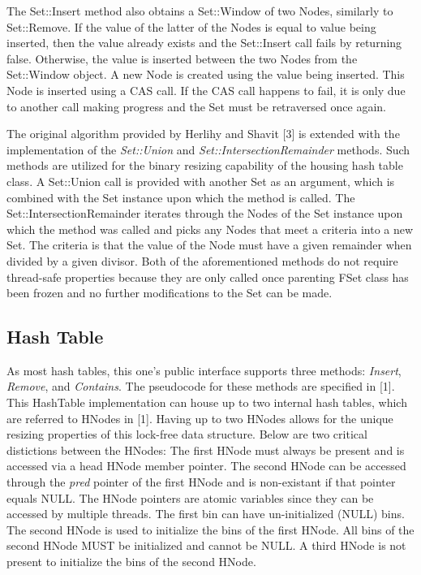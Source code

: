 \documentclass[11pt]{article} %
\begin{document}
The Set::Insert method also obtains a Set::Window of two Nodes, similarly to Set::Remove. If the value of the latter of the Nodes is equal to value being inserted, then the value already exists and the Set::Insert call fails by returning false. Otherwise, the value is inserted between the two Nodes from the Set::Window object. A new Node is created using the value being inserted. This Node is inserted using a CAS call. If the CAS call happens to fail, it is only due to another call making progress and the Set must be retraversed once again.

The original algorithm provided by Herlihy and Shavit [3] is extended with the implementation of the \textit{Set::Union} and \textit{Set::IntersectionRemainder} methods. Such methods are utilized for the binary resizing capability of the housing hash table class. A Set::Union call is provided with another Set as an argument, which is combined with the Set instance upon which the method is called. The Set::IntersectionRemainder iterates through the Nodes of the Set instance upon which the method was called and picks any Nodes that meet a criteria into a new Set. The criteria is that the value of the Node must have a given remainder when divided by a given divisor. Both of the aforementioned methods do not require thread-safe properties because they are only called once parenting FSet class has been frozen and no further modifications to the Set can be made.   


\subsection{Hash Table}

As most hash tables, this one's public interface supports three methods: \textit{Insert}, \textit{Remove}, and \textit{Contains}. The pseudocode for these methods are specified in [1]. This HashTable implementation can house up to two internal hash tables, which are referred to HNodes in [1]. Having up to two HNodes allows for the unique resizing properties of this lock-free data structure. Below are two critical distictions between the HNodes:
The first HNode must always be present and is accessed via a head HNode member pointer. The second HNode can be accessed through the \textit{pred} pointer of the first HNode and is non-existant if that pointer equals NULL. The HNode pointers are atomic variables since they can be accessed by multiple threads.
The first bin can have un-initialized (NULL) bins. The second HNode is used to initialize the bins of the first HNode. All bins of the second HNode MUST be initialized and cannot be NULL. A third HNode is not present to initialize the bins of the second HNode.
\end{document}

